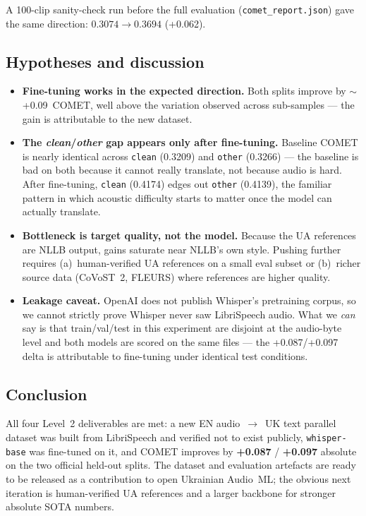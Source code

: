 \documentclass[11pt]{article}
\begin{document}
A 100-clip sanity-check run before the full evaluation
(\texttt{comet\_report.json}) gave the same direction:
$0.3074 \rightarrow 0.3694$ (+0.062).

\subsection{Hypotheses and discussion}
\begin{itemize}
    \item \textbf{Fine-tuning works in the expected direction.} Both splits
    improve by $\sim$+0.09~COMET, well above the variation observed across
    sub-samples --- the gain is attributable to the new dataset.
    \item \textbf{The \textit{clean}/\textit{other} gap appears only after
    fine-tuning.} Baseline COMET is nearly identical across \texttt{clean}
    (0.3209) and \texttt{other} (0.3266) --- the baseline is bad on both
    because it cannot really translate, not because audio is hard. After
    fine-tuning, \texttt{clean} (0.4174) edges out \texttt{other} (0.4139),
    the familiar pattern in which acoustic difficulty starts to matter once
    the model can actually translate.
    \item \textbf{Bottleneck is target quality, not the model.} Because the
    UA references are NLLB output, gains saturate near NLLB's own style.
    Pushing further requires (a)~human-verified UA references on a small
    eval subset or (b)~richer source data (CoVoST~2, FLEURS) where references
    are higher quality.
    \item \textbf{Leakage caveat.} OpenAI does not publish Whisper's
    pretraining corpus, so we cannot strictly prove Whisper never saw
    LibriSpeech audio. What we \emph{can} say is that train/val/test in this
    experiment are disjoint at the audio-byte level and both models are
    scored on the same files --- the +0.087/+0.097 delta is attributable to
    fine-tuning under identical test conditions.
\end{itemize}

\subsection{Conclusion}
All four Level~2 deliverables are met: a new EN audio~$\rightarrow$~UK text
parallel dataset was built from LibriSpeech and verified not to exist
publicly, \texttt{whisper-base} was fine-tuned on it, and COMET improves by
\textbf{+0.087} / \textbf{+0.097} absolute on the two official held-out
splits. The dataset and evaluation artefacts are ready to be released as a
contribution to open Ukrainian Audio~ML; the obvious next iteration is
human-verified UA references and a larger backbone for stronger absolute
SOTA numbers.
\end{document}
